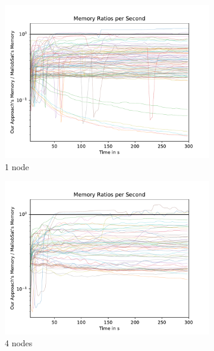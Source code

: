 \documentclass[12pt,a4paper,twoside]{scrartcl}
\numberwithin{equation}{section}
\begin{document}
\begin{figure}
  \center
  \begin{subfigure}[c]{.45\textwidth}
    \center
    \includegraphics[scale=.45]{plots/1node_compare/mem_ratio_per_second.pdf}
    \caption{1 node}
  \end{subfigure}
  \begin{subfigure}[c]{.45\textwidth}
    \center
    \includegraphics[scale=.45]{plots/4node_compare/mem_ratio_per_second.pdf}
    \caption{4 nodes}
  \end{subfigure}
  \begin{subfigure}[c]{.45\textwidth}
    \center

\end{subfigure}
\end{figure}
\end{document}
